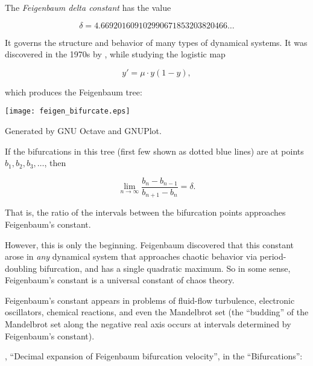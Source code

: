 \documentclass[12pt]{article}
\begin{document}

The \emph{Feigenbaum delta constant} has the value

\[
  \delta = 4.669201609102990671853203820466 \ldots
\]

It governs the structure and behavior of many types of dynamical systems.
It was discovered in the 1970s by
,
while studying the logistic map

\[
  y'= \mu \cdot y (1- y),
\]

which produces the Feigenbaum tree:

\begin{center}
\texttt{[image: feigen\_bifurcate.eps]}

{\tiny Generated by GNU Octave and GNUPlot.}
\end{center}

If the bifurcations in this tree (first few shown as dotted blue lines)
are at points $b_1, b_2, b_3, \ldots$, then

\[
  \lim_{n\rightarrow \infty} \frac{b_{n}-b_{n-1}}{b_{n+1}-b_{n}} = \delta.
\]

That is, the ratio of the intervals between the bifurcation points
approaches Feigenbaum's constant.

However, this is only the beginning.
Feigenbaum discovered that this constant
arose in \emph{any} dynamical system
that approaches chaotic behavior via period-doubling bifurcation,
and has a single quadratic maximum.
So in some sense, Feigenbaum's constant
is a universal constant of chaos theory.

Feigenbaum's constant appears in problems of fluid-flow turbulence,
electronic oscillators, chemical reactions, and even the Mandelbrot set
(the ``budding'' of the Mandelbrot set along the negative real axis
occurs at intervals determined by Feigenbaum's constant).

\begin{thebibliography}{3}
 , ``Decimal expansion of Feigenbaum bifurcation velocity'', in the 
 ``Bifurcations'': 
\end{thebibliography}
\end{document}

